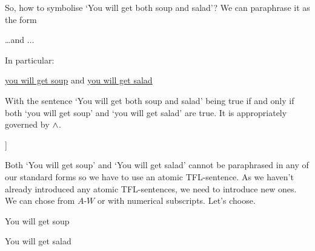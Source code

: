So, how to symbolise `You will get both soup and salad'? We can paraphrase it as the form \begin{samplesent}
	\item[]\ldots and $\ldots$
\end{samplesent}
In particular: 
\begin{samplesent}
	\item[] \underline{you will get soup} and \underline{you will get salad}
\end{samplesent}
With the sentence `You will get both soup and salad' being true if and only if both `you will get soup' and `you will get salad' are true. It is appropriately governed by $\mathbin{\wedge}$. 
\begin{center}
	\begin{forest}
		[You will get both soup and salad\\\ldots and \ldots\\$\almostinvisibleopenbracket\ldots {\eand} \ldots\almostinvisibleclosebracket$
		[You will get soup\\?]
		[You will get salad\\?]
		]
	\end{forest}
\end{center}
Both `You will get soup' and `You will get salad' cannot be paraphrased in any of our standard forms so we have to use an atomic TFL-sentence. As we haven't already introduced any atomic TFL-sentences, we need to introduce new ones. We can chose from $A$-$W$ or with numerical subscripts. Let's choose. 
\begin{ekey}
	\item[S_1] You will get soup
	\item[S_2] You will get salad
\end{ekey}


